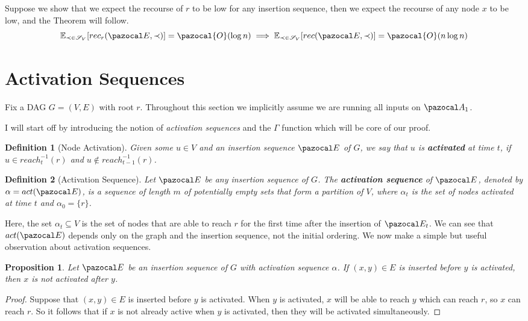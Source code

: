\documentclass{report}
\newtheorem{proposition}{Proposition}
\newtheorem{definition}{Definition}
\begin{document}
Suppose we show that we expect the recourse of $r$ to be low for any insertion sequence, then we expect the recourse of any node $x$ to be low, and the Theorem will follow.
\[ \mathbb{E}_{\prec \in \mathcal{S}_V}[ rec_r(\pazocal E, \prec)] = \pazocal{O}(\log n) \implies \mathbb{E}_{\prec \in \mathcal S_V}[ rec(\pazocal E, \prec)] = \pazocal{O}(n\log n) \]

\section{Activation Sequences}

Fix a DAG $G=(V,E)$ with root $r$. Throughout this section we implicitly assume we are running all inputs on $\pazocal A_1$.

I will start off by introducing the notion of \textit{activation sequences} and the $\Gamma$ function which will be core of our proof.

\begin{definition}[Node Activation]
Given some $u \in V$ and an insertion sequence $\pazocal E$ of $G$, we say that $u$ is \textbf{activated} at time $t$, if $u \in reach^{-1}_t(r)$ and $u \notin reach^{-1}_{t-1}(r)$.
\end{definition}

\begin{definition}[Activation Sequence]
Let $\pazocal E$ be any insertion sequence of $G$. The \textbf{activation sequence} of $\pazocal E$, denoted by $\alpha = act(\pazocal E)$, is a sequence of length $m$ of potentially empty sets that form a partition of $V$, where $\alpha_t$ is the set of nodes activated at time $t$ and $\alpha_0 = \{r\}$.
\end{definition}

Here, the set $\alpha_t \subseteq V$ is the set of nodes that are able to reach $r$ for the first time after the insertion of $\pazocal E_t$. We can see that $act(\pazocal E)$ depends only on the graph and the insertion sequence, not the initial ordering. We now make a simple but useful observation about activation sequences.

\begin{proposition}\label{activation prop 1}
Let $\pazocal E$ be an insertion sequence of $G$ with activation sequence $\alpha$. If $(x,y) \in E$ is inserted before $y$ is activated, then $x$ is not activated after $y$.
\end{proposition}

\begin{proof}
Suppose that $(x,y) \in E$ is inserted before $y$ is activated. When $y$ is activated, $x$ will be able to reach $y$ which can reach $r$, so $x$ can reach $r$. So it follows that if $x$ is not already active when $y$ is activated, then they will be activated simultaneously.
\end{proof}
\end{document}
